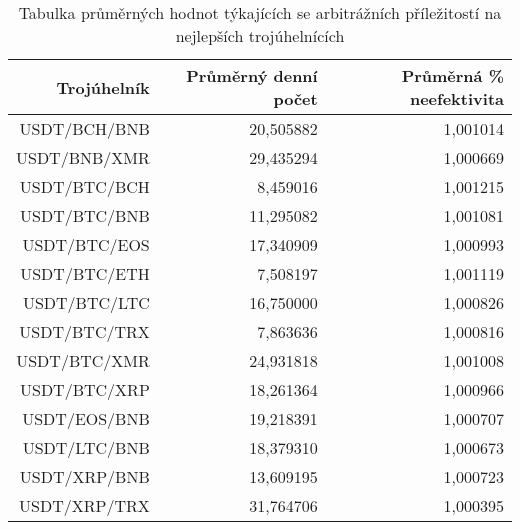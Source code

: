 \begin{table}\centering
\caption{Tabulka průměrných hodnot týkajících se arbitrážních příležitostí na nejlepších trojúhelnících}
\label{table_averages_best}
\begin{tabular}{|| r | r | r ||}\hline Trojúhelník & Průměrný denní počet & Průměrná \% neefektivita\\ [0.5ex]
 \hline\hline USDT/BCH/BNB & 20,505882 & 1,001014\\ 
 \hline USDT/BNB/XMR & 29,435294 & 1,000669\\ 
 \hline USDT/BTC/BCH & 8,459016 & 1,001215\\ 
 \hline USDT/BTC/BNB & 11,295082 & 1,001081\\ 
 \hline USDT/BTC/EOS & 17,340909 & 1,000993\\ 
 \hline USDT/BTC/ETH & 7,508197 & 1,001119\\ 
 \hline USDT/BTC/LTC & 16,750000 & 1,000826\\ 
 \hline USDT/BTC/TRX & 7,863636 & 1,000816\\ 
 \hline USDT/BTC/XMR & 24,931818 & 1,001008\\ 
 \hline USDT/BTC/XRP & 18,261364 & 1,000966\\ 
 \hline USDT/EOS/BNB & 19,218391 & 1,000707\\ 
 \hline USDT/LTC/BNB & 18,379310 & 1,000673\\ 
 \hline USDT/XRP/BNB & 13,609195 & 1,000723\\ 
 \hline USDT/XRP/TRX & 31,764706 & 1,000395\\ 
 \hline
\end{tabular}
\end{table}